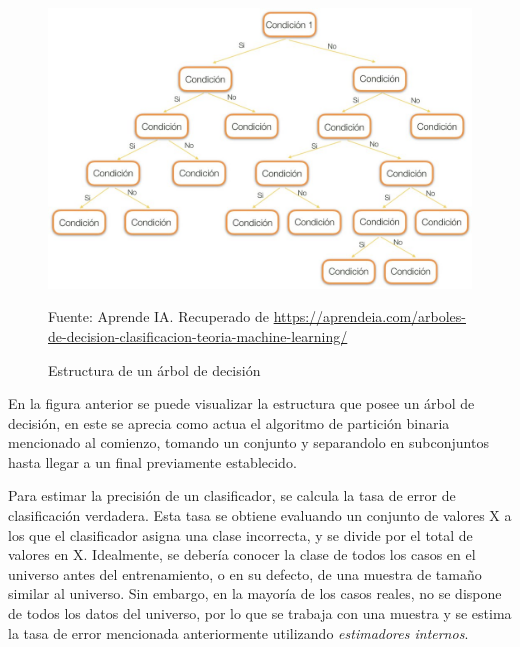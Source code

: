 \begin{figure}[H]
    \begin{minipage}[t]{0.9\textwidth}
        \caption{Estructura de un árbol de decisión}
        \label{arbol-de-decision}        
    \end{minipage}

    \vspace{10pt}

    \begin{minipage}[b]{1.1\textwidth}
        \centering
        \includegraphics[width=\textwidth]{img/estructura-arbol-de-decision.jpg}        
    \end{minipage}

    \begin{minipage}[t]{0.9\textwidth}
        Fuente: Aprende IA. Recuperado de \url{https://aprendeia.com/arboles-de-decision-clasificacion-teoria-machine-learning/}
    \end{minipage}
\end{figure}

En la figura anterior se puede visualizar la estructura que posee un árbol de decisión, en este se aprecia como actua el algoritmo de partición binaria mencionado al comienzo, tomando un conjunto y separandolo en subconjuntos hasta llegar a un final previamente establecido.

Para estimar la precisión de un clasificador, se calcula la tasa de error de clasificación verdadera. Esta tasa se obtiene evaluando un conjunto de valores X a los que el clasificador asigna una clase incorrecta, y se divide por el total de valores en X. Idealmente, se debería conocer la clase de todos los casos en el universo antes del entrenamiento, o en su defecto, de una muestra de tamaño similar al universo. Sin embargo, en la mayoría de los casos reales, no se dispone de todos los datos del universo, por lo que se trabaja con una muestra y se estima la tasa de error mencionada anteriormente utilizando \emph{estimadores internos}.

